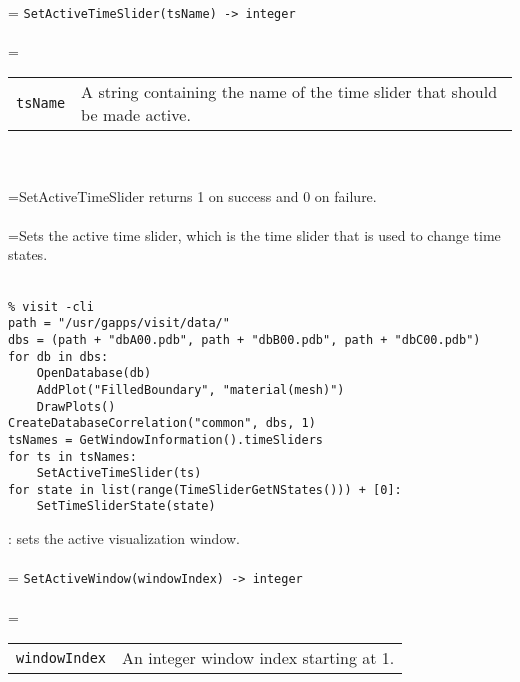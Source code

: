 \documentclass[10pt,a4paper]{report}
\begin{document}
 \\ 
\hangindent=\parindent 
\verb!SetActiveTimeSlider(tsName) -> integer!\\ [-3mm]

 \\ 
\hangindent=\parindent 
\begin{tabular}{lp{9cm}}
\verb!tsName! & A string containing the name of the time slider that should be made active. \\
\end{tabular} \\[-2mm]


 \\ 
\hangindent=\parindent SetActiveTimeSlider returns 1 on success and 0 on failure. \\[-3mm] 

 \\ 
\hangindent=\parindent Sets the active time slider, which is the time slider that is used to change time states. \\[-3mm] 

\\[-6mm]
\begin{verbatim}% visit -cli
path = "/usr/gapps/visit/data/"
dbs = (path + "dbA00.pdb", path + "dbB00.pdb", path + "dbC00.pdb")
for db in dbs:
    OpenDatabase(db)
    AddPlot("FilledBoundary", "material(mesh)")
    DrawPlots()
CreateDatabaseCorrelation("common", dbs, 1)
tsNames = GetWindowInformation().timeSliders
for ts in tsNames:
    SetActiveTimeSlider(ts)
for state in list(range(TimeSliderGetNStates())) + [0]:
    SetTimeSliderState(state)
\end{verbatim}
\newpage


{}
: sets the active visualization window.\\[-3mm]

 \\ 
\hangindent=\parindent 
\verb!SetActiveWindow(windowIndex) -> integer!\\ [-3mm]

 \\ 
\hangindent=\parindent 
\begin{tabular}{ll}
\verb!windowIndex! & An integer window index starting at 1. \\
\end{tabular} \\[-2mm]
\end{document}
